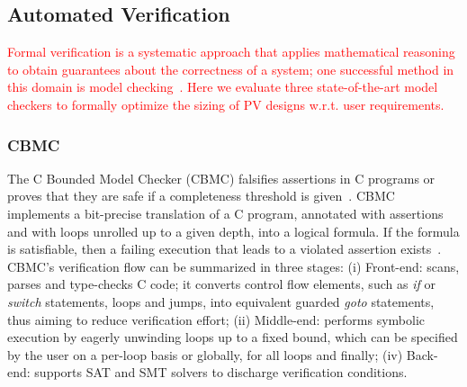 \documentclass[10pt,conference]{IEEEtran}
\begin{document}
\subsection{Automated Verification}
\label{sec:AutomatedVerification}
\textcolor{red}{Formal verification is a systematic approach that applies mathematical reasoning to obtain guarantees about the correctness of a system; one successful method in this domain is model checking~\cite{Clarke2012}. Here we evaluate three state-of-the-art model checkers to formally optimize the sizing of PV designs w.r.t. user requirements.}
\subsubsection{CBMC}
The C Bounded Model Checker (CBMC) falsifies assertions in C programs or proves that they are safe if a completeness threshold is given~\cite{Kroening}. CBMC implements a bit-precise translation of a C program, annotated with assertions and with loops unrolled up to a given depth, into a logical formula. If the formula is satisfiable, then a failing execution that leads to a violated assertion exists~\cite{Kroening}. CBMC's verification flow can be summarized in three stages: (i) Front-end: scans, parses and type-checks C code; it converts control flow elements, such as \textit{if} or \textit{switch} statements, loops and jumps, into equivalent guarded \textit{goto} statements, thus aiming to reduce verification effort; (ii) Middle-end: performs symbolic execution by eagerly unwinding loops up to a fixed bound, which can be specified by the user on a per-loop basis or globally, for all loops and finally; (iv) Back-end: supports SAT and SMT solvers to discharge verification conditions. 
\end{document}
